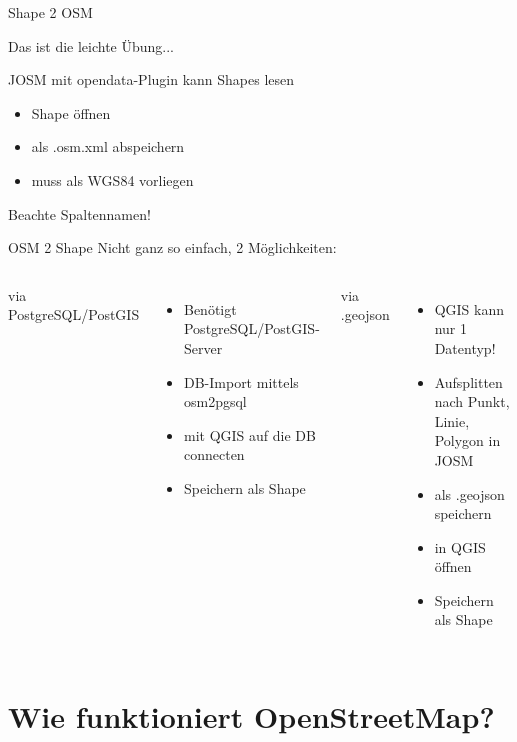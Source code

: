 \documentclass{beamer}
\begin{document}
\begin{frame}{Shape 2 OSM}

	Das ist die leichte Übung...
	\vspace{3mm}

	JOSM mit opendata-Plugin kann Shapes lesen

	\begin{itemize}
		\item Shape öffnen
		\item als .osm.xml abspeichern
		\item muss als WGS84 vorliegen
	\end{itemize}
	Beachte Spaltennamen!
\end{frame}

\begin{frame}{OSM 2 Shape}
	Nicht ganz so einfach, 2 Möglichkeiten:
\vspace{3mm}

 \begin{columns}[c]
	via PostgreSQL/PostGIS
		\begin{itemize}
			\item Benötigt PostgreSQL/PostGIS-Server
			\item DB-Import mittels osm2pgsql
			\item mit QGIS auf die DB connecten
			\item Speichern als Shape
		\end{itemize}
	via .geojson
		\begin{itemize}
			\item QGIS kann nur 1 Datentyp!
			\item Aufsplitten nach Punkt, Linie, Polygon in JOSM
			\item als .geojson speichern
			\item in QGIS öffnen
			\item Speichern als Shape
		\end{itemize}
\end{columns}

\end{frame}

\section{Wie funktioniert OpenStreetMap?}
\end{document}
